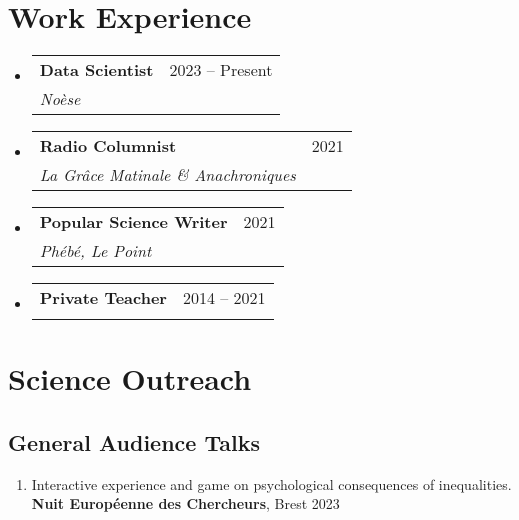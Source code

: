 \documentclass[letterpaper,11pt]{article}
\makeatletter
\newcommand{\resumeItem}[1]{
  \item\small{
    {#1 \vspace{-2pt}}
  }
}
\newcommand{\resumeItemWithYear}[3][ ]{ %
  \item\small{
    #2 \hfill {\small #3} \\
    #1
  }
}
\newcommand{\resumeSubheading}[4]{
  \vspace{1pt}\item
    \begin{tabular*}{0.97\textwidth}[t]{l@{\extracolsep{\fill}}r}
      \textbf{#1} & #2 \\
      \textit{\small#3} & \textit{\small #4} \\
    \end{tabular*}\vspace{-7pt}
}
\newcommand{\resumeSubSubheading}[2]{
    \item
    \begin{tabular*}{0.97\textwidth}{l@{\extracolsep{\fill}}r}
      \textit{\small#1} & \textit{\small #2} \\
    \end{tabular*}\vspace{-7pt}
}
\newcommand{\resumeSubHeadingListStart}{\begin{itemize}[leftmargin=0.15in, label={}]}
\newcommand{\resumeSubHeadingListEnd}{\end{itemize}}
\newcommand{\resumeItemListStart}{\begin{itemize}}
\newcommand{\resumeItemListEnd}{\end{itemize}\vspace{-5pt}}
\makeatother
\begin{document}
\section{Work Experience}
  \resumeSubHeadingListStart

    \resumeSubheading
      {Data Scientist}{2023 -- Present}
      {Noèse}{}
      
    \resumeSubheading
      {Radio Columnist}{2021}
      {La Grâce Matinale \& Anachroniques}{}

    \resumeSubheading
      {Popular Science Writer}{2021}
      {Phébé, Le Point}{}

    \resumeSubheading
      {Private Teacher}{2014 -- 2021}
      {}{}
      
  \resumeSubHeadingListEnd


\section{Science Outreach}
\subsection*{General Audience Talks}
\begin{enumerate}
    \resumeItemWithYear{Interactive experience and game on psychological consequences of inequalities. \textbf{Nuit Européenne des Chercheurs}, Brest}{2023}
\end{enumerate}





\end{document}
